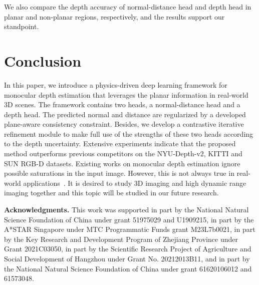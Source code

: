 \documentclass[10pt,twocolumn,letterpaper]{article}
\begin{document}
We also compare the depth accuracy of normal-distance
head and depth head in planar and non-planar regions, respectively, and the results support our standpoint.

\section{Conclusion}
In this paper, we introduce a physics-driven deep learning framework for monocular depth estimation that leverages the planar information in
real-world 3D scenes. The framework contains two heads,
a normal-distance head and a depth head. The predicted
normal and distance are regularized by a developed plane-aware consistency
constraint. Besides, we develop a contrastive iterative refinement module to make full use of the strengths of these two heads according to the depth uncertainty. Extensive experiments indicate that the proposed method outperforms previous competitors on the NYU-Depth-v2, KITTI and SUN
RGB-D datasets. Existing works on monocular depth estimation ignore possible saturations in the input image. However, this is not always true in real-world applications~\cite{zheng2022neural}. It is desired to study 3D imaging and high dynamic range imaging together and this topic will be studied in our future research.

\textbf{Acknowledgments.} This work was supported in part by the National Natural Science Foundation of China under grant 51975029 and U1909215, in part by the A*STAR Singapore under MTC Programmatic Funds grant M23L7b0021, in part by the Key Research and Development Program of Zhejiang Province under Grant 2021C03050, in part by the Scientific Research Project of Agriculture and Social Development of Hangzhou under Grant No. 20212013B11, and in part by the National Natural Science Foundation of China under grant 61620106012 and 61573048.

{\small


}
\end{document}
